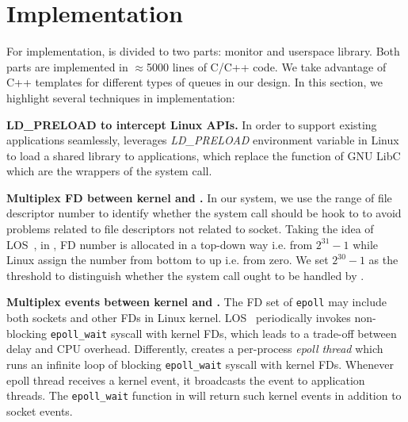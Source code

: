 \section{Implementation}
\label{sec:implementation}

For implementation, \libipc is divided to two parts: monitor and userspace library. Both parts are implemented in $\approx$5000 lines of C/C++ code. We take advantage of C++ templates for different types of queues in our design. %
In this section, we highlight several techniques in implementation:


\textbf{LD\_PRELOAD to intercept Linux APIs.}
In order to support existing applications seamlessly, \libipc leverages \textit{LD\_PRELOAD} environment variable in Linux to load a shared library to applications, which replace the function of GNU LibC which are the wrappers of the system call. 

\textbf{Multiplex FD between kernel and \libipc{}.}
In our system, we use the range of file descriptor number to identify whether the system call should be hook to \libipc to avoid problems related to file descriptors not related to socket. Taking the idea of LOS~\cite{huang2017high}, in \libipc, FD number is allocated in a top-down way i.e. from $2^{31}-1$ while Linux assign the number from bottom to up i.e. from zero. We set $2^{30} - 1 $ as the threshold to distinguish whether the system call ought to be handled by \libipc.

\textbf{Multiplex events between kernel and \libipc{}.}
The FD set of \texttt{epoll} may include both sockets and other FDs in Linux kernel. LOS~\cite{huang2017high} periodically invokes non-blocking \texttt{epoll\_wait} syscall with kernel FDs, which leads to a trade-off between delay and CPU overhead. Differently, \libipc{} creates a per-process \textit{epoll thread} which runs an infinite loop of blocking \texttt{epoll\_wait} syscall with kernel FDs. Whenever epoll thread receives a kernel event, it broadcasts the event to application threads. The \texttt{epoll\_wait} function in \libipc{} will return such kernel events in addition to socket events.


